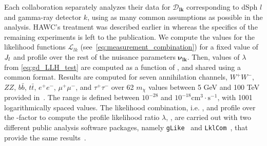 Each collaboration separately analyzes their data for $\bm{\mathcal{D}_{lk}}$ corresponding to dSph $l$ and gamma-ray detector $k$, using as many common assumptions as possible in the analysis.
HAWC's treatment was described earlier in  whereas the specifics of the remaining experiments is left to the publication.
We compute the values for the likelihood functions $\mathcal{L}_{lk}$ (see~\cref{eq:measurement_combination}) for a fixed value of $J_l$ and profile over the rest of the nuisance parameters $\bm{\nu_{lk}}$.
Then, values of $\lambda$ from \cref{eq:gd_LLH_test} are computed as a function of \sv, and shared using a common format.
Results are computed for seven annihilation channels, $W^+W^-$, $ZZ$, $b\bar{b}$, $t\bar{t}$, $e^+e^-$, $\mu^+\mu^-$, and $\tau^+\tau^-$ over 62 $m_{\chi}$ values between 5 GeV and 100 TeV provided in~\cite{Cirelli_2011}.
The \sv range is defined between $10^{-28}$ and $10^{-18}\mathrm{cm}^{3}\cdot \mathrm{s}^{-1}$, with 1001 logarithmically spaced values.
The likelihood combination, i.e. , and profile over the \J-factor to compute the profile likelihood ratio $\lambda$, , are carried out with two different public analysis software packages, namely \texttt{gLike}~\cite{javier_rico_2021_4601451} and \texttt{LklCom}~\cite{tjark_miener_2021_4597500}, that provide the same results~\cite{2021arXiv211201818M}.

